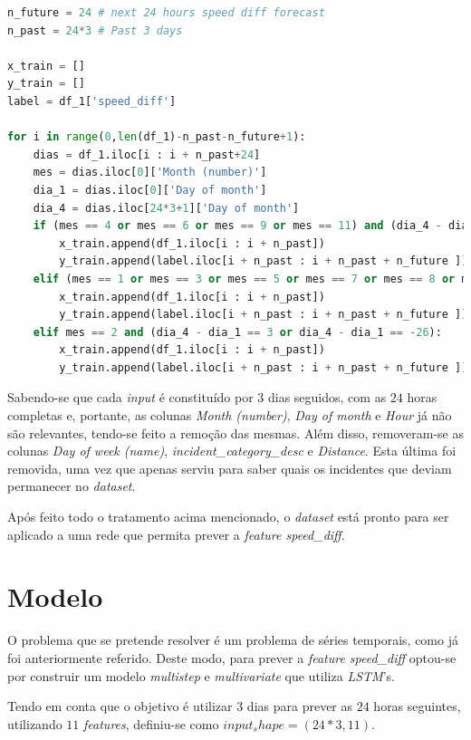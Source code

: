 \documentclass[a4paper, 12pt]{article}
\begin{document}
\begin{lstlisting}[language=Python]
n_future = 24 # next 24 hours speed diff forecast
n_past = 24*3 # Past 3 days

x_train = []
y_train = []
label = df_1['speed_diff']

for i in range(0,len(df_1)-n_past-n_future+1):
	dias = df_1.iloc[i : i + n_past+24]
	mes = dias.iloc[0]['Month (number)']
	dia_1 = dias.iloc[0]['Day of month']
	dia_4 = dias.iloc[24*3+1]['Day of month']
	if (mes == 4 or mes == 6 or mes == 9 or mes == 11) and (dia_4 - dia_1 == 3 or dia_4 - dia_1 == -29):
		x_train.append(df_1.iloc[i : i + n_past])
		y_train.append(label.iloc[i + n_past : i + n_past + n_future ])
	elif (mes == 1 or mes == 3 or mes == 5 or mes == 7 or mes == 8 or mes == 10 or mes == 12) and (dia_4 - dia_1 == 3 or dia_4 - dia_1 == -28):
		x_train.append(df_1.iloc[i : i + n_past])
		y_train.append(label.iloc[i + n_past : i + n_past + n_future ])
	elif mes == 2 and (dia_4 - dia_1 == 3 or dia_4 - dia_1 == -26):
		x_train.append(df_1.iloc[i : i + n_past])
		y_train.append(label.iloc[i + n_past : i + n_past + n_future ])
\end{lstlisting}

Sabendo-se que cada \textit{input} é constituído por $3$ dias seguidos, com as $24$ horas completas e, portante, as colunas \textit{Month (number)}, \textit{Day of month} e \textit{Hour} já não são relevantes, tendo-se feito a remoção das mesmas. Além disso, removeram-se as colunas \textit{Day of week (name)}, \textit{incident\_category\_desc} e \textit{Distance}. Esta última foi removida, uma vez que apenas serviu para saber quais os incidentes que deviam permanecer no \textit{dataset}.

Após feito todo o tratamento acima mencionado, o \textit{dataset} está pronto para ser aplicado a uma rede que permita prever a \textit{feature speed\_diff}.

\section{Modelo}

O problema que se pretende resolver é um problema de séries temporais, como já foi anteriormente referido. Deste modo, para prever a \textit{feature speed\_diff} optou-se por construir um modelo \textit{multistep} e \textit{multivariate} que utiliza \textit{LSTM}'s.

Tendo em conta que o objetivo é utilizar $3$ dias para prever as $24$ horas seguintes, utilizando $11$ \textit{features}, definiu-se como $input_shape = (24*3,11)$.
\end{document}
